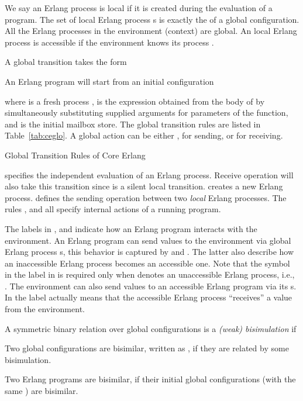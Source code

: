 \documentclass[runningheads, envcountsame, a4paper]{llncs}
\begin{document}
We say an Erlang process is local if it is created during the evaluation of a program.
The set of local Erlang process s is exactly the  of a global configuration.
All the Erlang processes in the environment (context) are global.
An local Erlang process is accessible if the environment knows its process .

A global transition takes the form

An Erlang program will start from an initial configuration

where  is a fresh process ,
 is the expression obtained from the body of  by simultaneously substituting
supplied arguments for parameters of the function,
and  is the initial mailbox store.
The global transition rules are listed in Table~\ref{tab:ceglo}.
A global action can be either ,  for sending, or  for receiving.

\begin{table}

\label{tab:ceglo}
\caption{Global Transition Rules of Core Erlang}
\end{table}

 specifies the independent evaluation of an Erlang process.
Receive operation will also take this transition since  is a silent local transition.
 creates a new Erlang process.
 defines the sending operation between two \emph{local} Erlang processes.
The rules ,  and  all specify internal actions of a running program.

The labels in ,  and  indicate how an Erlang program interacts with the environment.
An Erlang program can send values to the environment via global Erlang process s,
this behavior is captured by  and .
The latter also describe how an inaccessible Erlang process becomes an accessible one.
Note that the  symbol in the label  in  is required only when  denotes an unaccessible Erlang process, i.e., .
The environment can also send values to an accessible Erlang program via its s.
In  the label  actually means that the accessible Erlang process  ``receives'' a value 
from the environment.

\begin{definition}
  A symmetric binary relation  over global configurations is a \emph{(weak) bisimulation} if
  
  Two global configurations are bisimilar, written as , if they are related by some bisimulation.
\label{def:ecwb}
\end{definition}
Two Erlang programs  are bisimilar, if their initial global configurations (with the same ) are bisimilar.
\end{document}
